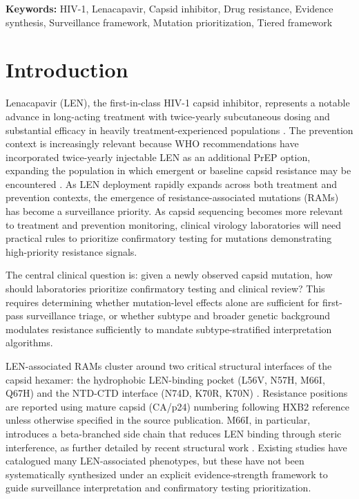 \documentclass[12pt,a4paper]{article}
\begin{document}
\textbf{Keywords:} HIV-1, Lenacapavir, Capsid inhibitor, Drug resistance, Evidence synthesis, Surveillance framework, Mutation prioritization, Tiered framework

\linenumbers

\section{Introduction}

Lenacapavir (LEN), the first-in-class HIV-1 capsid inhibitor, represents a notable advance in long-acting treatment with twice-yearly subcutaneous dosing and substantial efficacy in heavily treatment-experienced populations \cite{Link2020,SegalMaurer2022}. The prevention context is increasingly relevant because WHO recommendations have incorporated twice-yearly injectable LEN as an additional PrEP option, expanding the population in which emergent or baseline capsid resistance may be encountered \cite{WHOLENPrEP2025}. As LEN deployment rapidly expands across both treatment and prevention contexts, the emergence of resistance-associated mutations (RAMs) has become a surveillance priority. As capsid sequencing becomes more relevant to treatment and prevention monitoring, clinical virology laboratories will need practical rules to prioritize confirmatory testing for mutations demonstrating high-priority resistance signals.

The central clinical question is: given a newly observed capsid mutation, how should laboratories prioritize confirmatory testing and clinical review? This requires determining whether mutation-level effects alone are sufficient for first-pass surveillance triage, or whether subtype and broader genetic background modulates resistance sufficiently to mandate subtype-stratified interpretation algorithms.

LEN-associated RAMs cluster around two critical structural interfaces of the capsid hexamer: the hydrophobic LEN-binding pocket (L56V, N57H, M66I, Q67H) and the NTD-CTD interface (N74D, K70R, K70N) \cite{Bester2022,Margot2025}. Resistance positions are reported using mature capsid (CA/p24) numbering following HXB2 reference unless otherwise specified in the source publication. M66I, in particular, introduces a beta-branched side chain that reduces LEN binding through steric interference, as further detailed by recent structural work \cite{MBio2025}. Existing studies have catalogued many LEN-associated phenotypes, but these have not been systematically synthesized under an explicit evidence-strength framework to guide surveillance interpretation and confirmatory testing prioritization.
\end{document}

